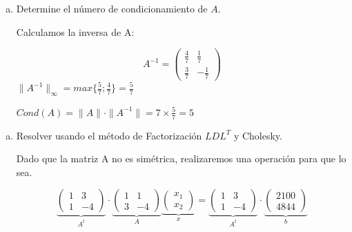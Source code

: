 \begin{frame}
	\begin{solution}
		\begin{enumerate}[c)]
			\item
			      Determine el número de condicionamiento de $A$.

			      Calculamos la inversa de A:

			      \begin{equation*}
				      A^{-1}=
				      \begin{pmatrix}
					      \frac{4}{7} & \frac{1}{7}  \\
					      \frac{3}{7} & -\frac{1}{7}
				      \end{pmatrix}
			      \end{equation*}
			      $\|A^{-1}\|_{\infty}=max\{\frac{5}{7};\frac{4}{7}\}=\frac{5}{7}$

			      $Cond(A)=\|A\|\cdot\|A^{-1}\|=7\times \frac{5}{7}=5$
		\end{enumerate}
		\begin{enumerate}[d)]
			\item
			      Resolver usando el método de Factorización
			      $LDL^{T}$ y Cholesky.

			      Dado que la matriz A no es simétrica, realizaremos una operación para que lo sea.

			      \begin{equation*}
				      \underbrace{\begin{pmatrix}
						      1 & 3  \\
						      1 & -4
					      \end{pmatrix}}_{A^t}
				      \cdot
				      \underbrace{\begin{pmatrix}
						      1 & 1  \\
						      3 & -4
					      \end{pmatrix}}_{A}
				      \underbrace{\begin{pmatrix}
						      x_{1} \\
						      x_{2}
					      \end{pmatrix}}_{x}
				      =\underbrace{\begin{pmatrix}
						      1 & 3  \\
						      1 & -4
					      \end{pmatrix}}_{A^t}
				      \cdot
				      \underbrace{\begin{pmatrix}
						      2100 \\
						      4844
					      \end{pmatrix}}_{b}
			      \end{equation*}


\end{enumerate}
\end{solution}
\end{frame}
